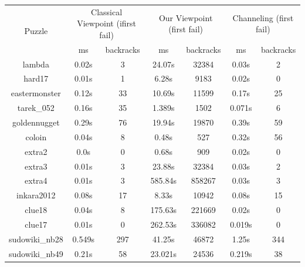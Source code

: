 \documentclass{report}
\begin{document}
\begin{table}[h!]
  \begin{tabular}{|c|c|c|c|c|c|c|}
    \hline
    \multirow{2}{*}{Puzzle} &
      \multicolumn{2}{L|}{Classical Viewpoint (ifirst fail)} &
      \multicolumn{2}{L|}{Our Viewpoint (first fail)} &
      \multicolumn{2}{L|}{ Channeling (first fail)} \\
    & ms & backracks & ms & backracks & ms & backracks \\
    \hline
lambda & 0.02s & 3 & 24.07s & 32384 & 0.03s & 2\\
hard17 & 0.01s & 1 & 6.28s & 9183 & 0.02s & 0\\
eastermonster & 0.12s & 33 & 10.69s & 11599 & 0.17s & 25\\
tarek\_052 & 0.16s & 35 & 1.389s & 1502 & 0.071s & 6\\
goldennugget & 0.29s & 76 & 19.94s & 19870 & 0.39s & 59\\
coloin & 0.04s & 8 & 0.48s & 527 & 0.32s & 56\\
extra2 & 0.0s & 0 & 0.68s & 909 & 0.02s & 0\\
extra3 & 0.01s & 3 & 23.88s & 32384 & 0.03s & 2\\
extra4 & 0.01s & 3 & 585.84s & 858267 & 0.03s & 3\\
inkara2012 & 0.08s & 17 & 8.33s & 10942 & 0.08s & 15\\
clue18 & 0.04s & 8 & 175.63s & 221669 & 0.02s & 0\\
clue17 & 0.01s & 0 & 262.53s & 336082 & 0.019s & 0\\
sudowiki\_nb28 & 0.549s & 297 & 41.25s & 46872 & 1.25s & 344\\
sudowiki\_nb49 & 0.21s & 58 & 23.021s & 24536 & 0.219s & 38\\
 \hline
  \end{tabular}
\end{table}
\end{document}
